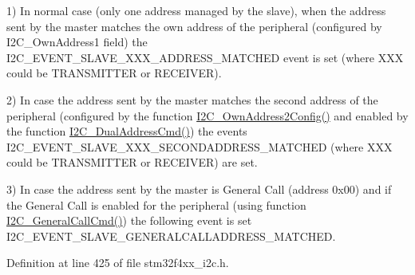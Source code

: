 1) In normal case (only one address managed by the slave), when the address sent by the master matches the own address of the peripheral (configured by I2\-C\-\_\-\-Own\-Address1 field) the I2\-C\-\_\-\-E\-V\-E\-N\-T\-\_\-\-S\-L\-A\-V\-E\-\_\-\-X\-X\-X\-\_\-\-A\-D\-D\-R\-E\-S\-S\-\_\-\-M\-A\-T\-C\-H\-E\-D event is set (where X\-X\-X could be T\-R\-A\-N\-S\-M\-I\-T\-T\-E\-R or R\-E\-C\-E\-I\-V\-E\-R).

2) In case the address sent by the master matches the second address of the peripheral (configured by the function \hyperlink{group___i2_c_ga7be2cc634a613c8e3539137e897a22df}{I2\-C\-\_\-\-Own\-Address2\-Config()} and enabled by the function \hyperlink{group___i2_c_ga02145a333a56e79557d6ef4ea03fc313}{I2\-C\-\_\-\-Dual\-Address\-Cmd()}) the events I2\-C\-\_\-\-E\-V\-E\-N\-T\-\_\-\-S\-L\-A\-V\-E\-\_\-\-X\-X\-X\-\_\-\-S\-E\-C\-O\-N\-D\-A\-D\-D\-R\-E\-S\-S\-\_\-\-M\-A\-T\-C\-H\-E\-D (where X\-X\-X could be T\-R\-A\-N\-S\-M\-I\-T\-T\-E\-R or R\-E\-C\-E\-I\-V\-E\-R) are set.

3) In case the address sent by the master is General Call (address 0x00) and if the General Call is enabled for the peripheral (using function \hyperlink{group___i2_c_ga65c740fc8d7b3b9f15cc432d8699d471}{I2\-C\-\_\-\-General\-Call\-Cmd()}) the following event is set I2\-C\-\_\-\-E\-V\-E\-N\-T\-\_\-\-S\-L\-A\-V\-E\-\_\-\-G\-E\-N\-E\-R\-A\-L\-C\-A\-L\-L\-A\-D\-D\-R\-E\-S\-S\-\_\-\-M\-A\-T\-C\-H\-E\-D. 

Definition at line 425 of file stm32f4xx\-\_\-i2c.\-h.


